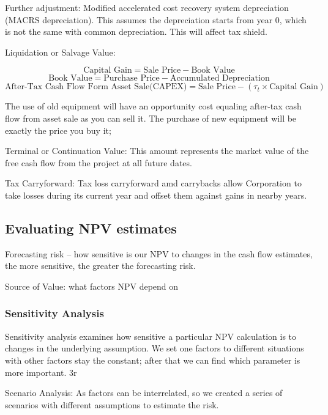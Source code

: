 \documentclass[10pt, a4paper]{article}
\begin{document}
    Further  adjustment: Modified accelerated cost recovery system depreciation (MACRS depreciation). This assumes the depreciation starts from year 0, which is not the same with common depreciation. This will affect tax shield.
    \medskip
    
    Liquidation or Salvage Value:

    $$\text{Capital Gain} = \text{Sale Price} - \text{Book Value}$$
    $$\text{Book Value} = \text{Purchase Price} - \text{Accumulated Depreciation}$$
    $$\text{After-Tax Cash Flow Form Asset Sale(CAPEX)} = \text{Sale Price} - (\tau_t \times \text{Capital Gain})$$

    The use of old equipment will have an opportunity cost equaling after-tax cash flow from asset sale as you can sell it. The purchase of new equipment will be exactly the price you buy it; 

    \medskip

    Terminal or Continuation Value: This amount represents the market value of the free cash flow from the project at all future dates. 


    Tax Carryforward: Tax loss carryforward  amd carrybacks allow Corporation to take losses during its current year and offset them against gains in nearby years. 

    \subsection{Evaluating NPV estimates} 
        Forecasting risk -- how sensitive is our NPV to changes in the cash flow estimates, the more sensitive, the greater the forecasting risk. 

        Source of Value: what factors NPV depend on

        \subsubsection{Sensitivity Analysis} 
            Sensitivity analysis examines how sensitive a particular NPV calculation is to changes in the underlying assumption. We set one factors to different situations with other factors stay the constant; after that we can find which parameter is more important. 3r

            Scenario Analysis: As factors can be interrelated, so we created a series of scenarios with different assumptions to estimate the risk. 
\end{document}
